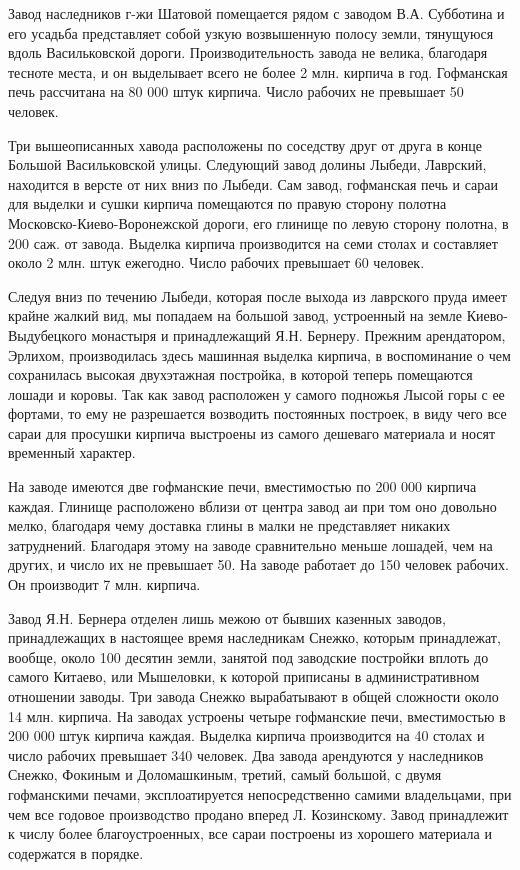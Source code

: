 Завод наследников г-жи Шатовой помещается рядом с заводом В.А. Субботина и его усадьба представляет собой узкую возвышенную полосу земли, тянущуюся вдоль Васильковской дороги. Производительность завода не велика, благодаря тесноте места, и он выделывает всего не более 2 млн. кирпича в год. Гофманская печь рассчитана на 80 000 штук кирпича. Число рабочих не превышает 50 человек.

Три вышеописанных хавода расположены по соседству друг от друга в конце Большой Васильковской улицы. Следующий завод долины Лыбеди, Лаврский, находится в версте от них вниз по Лыбеди. Сам завод, гофманская печь и сараи для выделки и сушки кирпича помещаются по правую сторону полотна Московско-Киево-Воронежской дороги, его глинище по левую сторону полотна, в 200 саж. от завода. Выделка кирпича производится на семи столах и составляет около 2 млн. штук ежегодно. Число рабочих превышает 60 человек.

Следуя вниз по течению Лыбеди, которая после выхода из лаврского пруда имеет крайне жалкий вид, мы попадаем на большой завод, устроенный на земле Киево-Выдубецкого монастыря и принадлежащий Я.Н. Бернеру. Прежним арендатором, Эрлихом, производилась здесь машинная выделка кирпича, в воспоминание о чем сохранилась высокая двухэтажная постройка, в которой теперь помещаются лошади и коровы. Так как завод расположен у самого подножья Лысой горы с ее фортами, то ему не разрешается возводить постоянных построек, в виду чего все сараи для просушки кирпича выстроены из самого дешеваго материала и носят временный характер.

На заводе имеются две гофманские печи, вместимостью по 200 000 кирпича каждая. Глинище расположено вблизи от центра завод аи при том оно довольно мелко, благодаря чему доставка глины в малки не представляет никаких затруднений. Благодаря этому на заводе сравнительно меньше лошадей, чем на других, и число их не превышает 50. На заводе работает до 150 человек рабочих. Он производит 7 млн. кирпича.

Завод Я.Н. Бернера отделен лишь межою от бывших казенных заводов, принадлежащих в настоящее время наследникам Снежко, которым принадлежат, вообще, около 100 десятин земли, занятой под заводские постройки вплоть до самого Китаево, или Мышеловки, к которой приписаны в административном отношении заводы. Три завода Снежко вырабатывают в общей сложности около 14 млн. кирпича. На заводах устроены четыре гофманские печи, вместимостью в 200 000 штук кирпича каждая. Выделка кирпича производится на 40 столах и число рабочих превышает 340 человек. Два завода арендуются у наследников Снежко, Фокиным и Доломашкиным, третий, самый большой, с двумя гофманскими печами, эксплоатируется непосредственно самими владельцами, при чем все годовое производство продано вперед Л. Козинскому. Завод принадлежит к числу более благоустроенных, все сараи построены из хорошего материала и содержатся в порядке.

